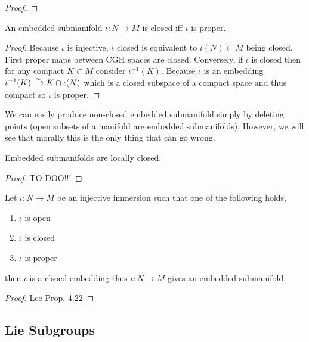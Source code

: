 \documentclass[12pt]{article}
\begin{document}
\begin{proof}
\end{proof}

\begin{prop}
An embedded submanifold $\iota : N \to M$ is closed iff $\iota$ is proper.
\end{prop}

\begin{proof}
Because $\iota$ is injective, $\iota$ closed is equivalent to $\iota(N) \subset M$ being closed. First proper maps between CGH spaces are closed. Conversely, if $\iota$ is closed then for any compact $K \subset M$ consider $\iota^{-1}(K)$. Because $\iota$ is an embedding $\iota^{-1}(K) \xrightarrow{\sim} K \cap \iota(N)$ which is a closed subspace of a compact space and thus compact so $\iota$ is proper.
\end{proof}

\begin{rmk}
We can easily produce non-closed embedded submanifold simply by deleting points (open subsets of a manifold are embedded submanifolds). However, we will see that morally this is the only thing that can go wrong.
\end{rmk}

\begin{prop}
Embedded submanifolds are locally closed.
\end{prop}

\begin{proof}
TO DOO!!!
\end{proof}

\begin{prop}
Let $\iota : N \to M$ be an injective immersion such that one of the following holds,
\begin{enumerate}
\item $\iota$ is open
\item $\iota$ is closed 
\item $\iota$ is proper
\end{enumerate} 
then $\iota$ is a clsoed embedding thus $\iota : N \to M$ gives an embedded submanifold.
\end{prop}

\begin{proof}
Lee Prop. 4.22
\end{proof}

\subsection{Lie Subgroups}
\end{document}
